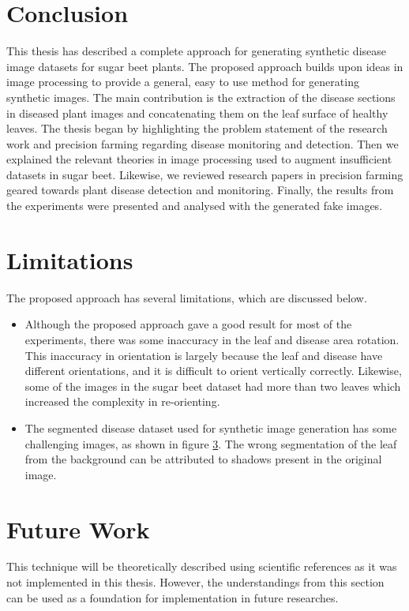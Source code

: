 \section{Conclusion}
This thesis has described a complete approach for generating synthetic disease image datasets for sugar beet plants. The proposed approach builds upon ideas in image processing to provide a general, easy to use method for generating synthetic images. The main contribution is the extraction of the disease sections in diseased plant images and concatenating them on the leaf surface of healthy leaves. The thesis began by highlighting the problem statement of the research work and precision farming regarding disease monitoring and detection. Then we explained the relevant theories in image processing used to augment insufficient datasets in sugar beet. Likewise, we reviewed research papers in precision farming geared towards plant disease detection and monitoring. Finally, the results from the experiments were presented and analysed with the generated fake images.

\section{Limitations}


The proposed approach has several limitations, which are discussed below. 
\begin{itemize}
    \item Although the proposed approach gave a good result for most of the experiments, there was some inaccuracy in the leaf and disease area rotation. This inaccuracy in orientation is largely because the leaf and disease have different orientations, and it is difficult to orient vertically correctly. Likewise, some of the images in the sugar beet dataset had more than two leaves which increased the complexity in re-orienting.
    
    \item The segmented disease dataset used for synthetic image generation has some challenging images, as shown in figure \ref{}. The wrong segmentation of the leaf from the background can be attributed to shadows present in the original image.
\end{itemize}





\section{Future Work}
This technique will be theoretically described using scientific references as it was not implemented in this thesis. However, the understandings from this section can be used as a foundation for implementation in future researches.

